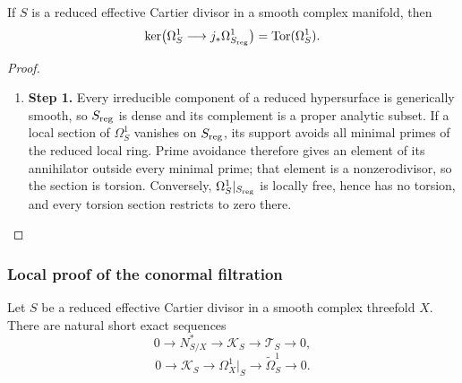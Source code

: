 \begin{lemma}
\hypertarget{tag-03IF}{}\label{wbII:lem:torsion-identification}

If $S$ is a reduced effective Cartier divisor in a smooth complex manifold,
then
\[
\ker\bigl(\Omega^1_S\longrightarrow j_*\Omega^1_{S_{\rm reg}}\bigr)
  =\operatorname{Tor}(\Omega^1_S).
\]
\end{lemma}



\begin{proof}
\begin{enumerate}[label={$\langle1\rangle$\arabic*.},leftmargin=*]
\item 
\noindent\textbf{Step 1.} Every irreducible component of a reduced hypersurface is generically smooth,
so $S_{\rm reg}$ is dense and its complement is a proper analytic subset.
If a local section of $\Omega^1_S$ vanishes on $S_{\rm reg}$, its support avoids
all minimal primes of the reduced local ring.  Prime avoidance therefore gives
an element of its annihilator outside every minimal prime; that element is a
nonzerodivisor, so the section is torsion.  Conversely,
$\Omega^1_S|_{S_{\rm reg}}$ is locally free, hence has no torsion, and every
torsion section restricts to zero there.

\end{enumerate}
\end{proof}



\subsubsection*{Local proof of the conormal filtration}


Let $S$ be a reduced effective Cartier divisor in a smooth complex
threefold $X$.  There are natural short exact sequences
\[
0\longrightarrow N^*_{S/X}\longrightarrow\mathscr K_S
\longrightarrow\mathscr T_S\longrightarrow0,
\]
\[
0\longrightarrow\mathscr K_S\longrightarrow\Omega_X^1|_S
\longrightarrow\widetilde\Omega_S^1\longrightarrow0.
\]



